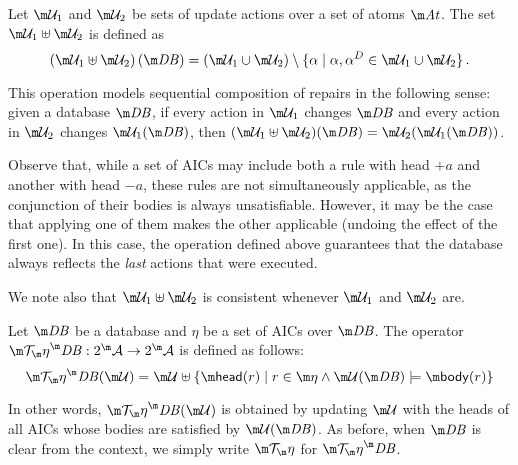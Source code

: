 
\begin{definition}
  Let $\UU_1$ and $\UU_2$ be sets of update actions over a set of atoms $\atoms$.
  The set $\UU_1\uplus\UU_2$ is defined as
  \[\left(\UU_1\uplus \UU_2\right)(\db) = \left(\UU_1\cup \UU_2\right) \setminus \{\alpha \mid \alpha,\alpha^D\in \UU_1\cup\UU_2\}\,.\]
\end{definition}
This operation models sequential composition of repairs in the following sense: given a database $\db$, if every action in $\UU_1$ changes $\db$ and every action in $\UU_2$ changes $\UU_1(\db)$, then $(\UU_1\uplus\UU_2)(\db)=\UU_2(\UU_1(\db))$.

Observe that, while a set of AICs may include both a rule with head $+a$ and another with head $-a$, these rules are not simultaneously applicable, as the conjunction of their bodies is always unsatisfiable.
However, it may be the case that applying one of them makes the other applicable (undoing the effect of the first one).
In this case, the operation defined above guarantees that the database always reflects the \emph{last} actions that were executed.

We note also that $\UU_1\uplus\UU_2$ is consistent whenever $\UU_1$ and $\UU_2$ are.
%
\begin{definition}
  Let $\db$ be a database and $\eta$ be a set of AICs over $\db$.
  The operator $\Op^\db:2^\acts\to 2^\acts$ is defined as follows:
  \[
    \Op^\db(\UU) = \UU\uplus\{\head(r)\mid r\in \aics \land \UU(\db)\models\body(r)\}
  \]
\end{definition}
In other words, $\Op^\db(\UU)$ is obtained by updating $\UU$ with the heads of all AICs whose bodies are satisfied by $\UU(\db)$.
As before, when $\db$ is clear from the context, we simply write $\Op$ for $\Op^\db$.

